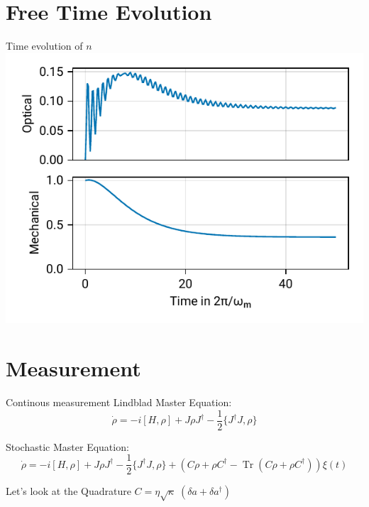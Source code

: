 \documentclass{beamer}
\DeclareMathOperator{\Tr}{Tr}
\begin{document}
\section{Free Time Evolution}
\begin{frame}{Time evolution of $n$}
	\centering
	\includegraphics{figures/01 cooling.pdf}
\end{frame}

\section{Measurement}
\begin{frame}{Continous measurement}
	\textcolor{seegrau}{
		Lindblad Master Equation:
		$$\dot\rho = -i[H,\rho] + J\rho J^\dagger - \frac{1}{2} \{J^\dagger J, \rho\}$$
	}

	Stochastic Master Equation:
	$$
		\dot\rho 
		= -i[H,\rho] 
		+ J\rho J^\dagger - \frac{1}{2} \{J^\dagger J, \rho\} 
		+ \left(C\rho + \rho C^\dagger - \Tr(C\rho + \rho C^\dagger)\right)\xi(t)
	$$

	Let's look at the Quadrature $C = \eta\sqrt{\kappa}\;(\delta a + \delta a^\dagger)$

\end{frame}
\end{document}
